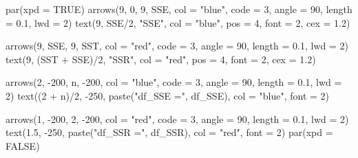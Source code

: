 \documentclass[
  letterpaper,
  DIV=11,
  numbers=noendperiod]{scrreprt}
\newenvironment{Shaded}{\begin{snugshade}}{\end{snugshade}}
\newcommand{\AttributeTok}[1]{\textcolor[rgb]{0.40,0.45,0.13}{#1}}
\newcommand{\ConstantTok}[1]{\textcolor[rgb]{0.56,0.35,0.01}{#1}}
\newcommand{\DecValTok}[1]{\textcolor[rgb]{0.68,0.00,0.00}{#1}}
\newcommand{\FloatTok}[1]{\textcolor[rgb]{0.68,0.00,0.00}{#1}}
\newcommand{\FunctionTok}[1]{\textcolor[rgb]{0.28,0.35,0.67}{#1}}
\newcommand{\NormalTok}[1]{\textcolor[rgb]{0.00,0.23,0.31}{#1}}
\newcommand{\SpecialCharTok}[1]{\textcolor[rgb]{0.37,0.37,0.37}{#1}}
\newcommand{\StringTok}[1]{\textcolor[rgb]{0.13,0.47,0.30}{#1}}
\begin{document}
\begin{Shaded}
\begin{Highlighting}[]
\FunctionTok{par}\NormalTok{(}\AttributeTok{xpd =} \ConstantTok{TRUE}\NormalTok{)}
\FunctionTok{arrows}\NormalTok{(}\DecValTok{9}\NormalTok{, }\DecValTok{0}\NormalTok{, }\DecValTok{9}\NormalTok{, SSE, }\AttributeTok{col =} \StringTok{"blue"}\NormalTok{, }\AttributeTok{code =} \DecValTok{3}\NormalTok{, }\AttributeTok{angle =} \DecValTok{90}\NormalTok{, }\AttributeTok{length =} \FloatTok{0.1}\NormalTok{, }\AttributeTok{lwd =} \DecValTok{2}\NormalTok{)}
\FunctionTok{text}\NormalTok{(}\DecValTok{9}\NormalTok{, SSE}\SpecialCharTok{/}\DecValTok{2}\NormalTok{, }\StringTok{"SSE"}\NormalTok{, }\AttributeTok{col =} \StringTok{"blue"}\NormalTok{, }\AttributeTok{pos =} \DecValTok{4}\NormalTok{, }\AttributeTok{font =} \DecValTok{2}\NormalTok{, }\AttributeTok{cex =} \FloatTok{1.2}\NormalTok{)}

\FunctionTok{arrows}\NormalTok{(}\DecValTok{9}\NormalTok{, SSE, }\DecValTok{9}\NormalTok{, SST, }\AttributeTok{col =} \StringTok{"red"}\NormalTok{, }\AttributeTok{code =} \DecValTok{3}\NormalTok{, }\AttributeTok{angle =} \DecValTok{90}\NormalTok{, }\AttributeTok{length =} \FloatTok{0.1}\NormalTok{, }\AttributeTok{lwd =} \DecValTok{2}\NormalTok{)}
\FunctionTok{text}\NormalTok{(}\DecValTok{9}\NormalTok{, (SST }\SpecialCharTok{+}\NormalTok{ SSE)}\SpecialCharTok{/}\DecValTok{2}\NormalTok{, }\StringTok{"SSR"}\NormalTok{, }\AttributeTok{col =} \StringTok{"red"}\NormalTok{, }\AttributeTok{pos =} \DecValTok{4}\NormalTok{, }\AttributeTok{font =} \DecValTok{2}\NormalTok{, }\AttributeTok{cex =} \FloatTok{1.2}\NormalTok{)}

\FunctionTok{arrows}\NormalTok{(}\DecValTok{2}\NormalTok{, }\SpecialCharTok{{-}}\DecValTok{200}\NormalTok{, n, }\SpecialCharTok{{-}}\DecValTok{200}\NormalTok{, }\AttributeTok{col =} \StringTok{"blue"}\NormalTok{, }\AttributeTok{code =} \DecValTok{3}\NormalTok{, }\AttributeTok{angle =} \DecValTok{90}\NormalTok{, }\AttributeTok{length =} \FloatTok{0.1}\NormalTok{, }\AttributeTok{lwd =} \DecValTok{2}\NormalTok{)}
\FunctionTok{text}\NormalTok{((}\DecValTok{2} \SpecialCharTok{+}\NormalTok{ n)}\SpecialCharTok{/}\DecValTok{2}\NormalTok{, }\SpecialCharTok{{-}}\DecValTok{250}\NormalTok{, }\FunctionTok{paste}\NormalTok{(}\StringTok{"df\_SSE ="}\NormalTok{, df\_SSE), }\AttributeTok{col =} \StringTok{"blue"}\NormalTok{, }\AttributeTok{font =} \DecValTok{2}\NormalTok{)}

\FunctionTok{arrows}\NormalTok{(}\DecValTok{1}\NormalTok{, }\SpecialCharTok{{-}}\DecValTok{200}\NormalTok{, }\DecValTok{2}\NormalTok{, }\SpecialCharTok{{-}}\DecValTok{200}\NormalTok{, }\AttributeTok{col =} \StringTok{"red"}\NormalTok{, }\AttributeTok{code =} \DecValTok{3}\NormalTok{, }\AttributeTok{angle =} \DecValTok{90}\NormalTok{, }\AttributeTok{length =} \FloatTok{0.1}\NormalTok{, }\AttributeTok{lwd =} \DecValTok{2}\NormalTok{)}
\FunctionTok{text}\NormalTok{(}\FloatTok{1.5}\NormalTok{, }\SpecialCharTok{{-}}\DecValTok{250}\NormalTok{, }\FunctionTok{paste}\NormalTok{(}\StringTok{"df\_SSR ="}\NormalTok{, df\_SSR), }\AttributeTok{col =} \StringTok{"red"}\NormalTok{, }\AttributeTok{font =} \DecValTok{2}\NormalTok{)}
\FunctionTok{par}\NormalTok{(}\AttributeTok{xpd =} \ConstantTok{FALSE}\NormalTok{)}


\end{Highlighting}
\end{Shaded}
\end{document}

